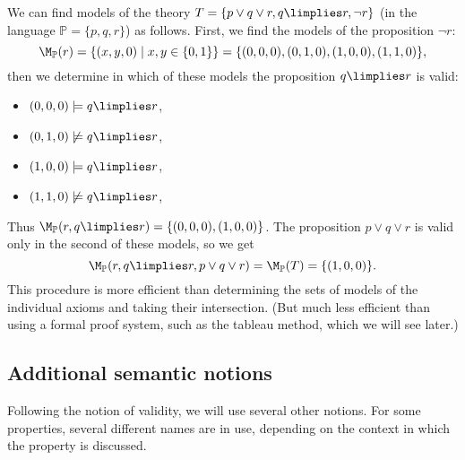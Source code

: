\begin{example}
    We can find models of the theory $T = \{p \lor q \lor r, q \limplies r, \neg r\}$ (in the language $\mathbb P = \{p, q, r\}$) as follows. First, we find the models of the proposition $\neg r$:
    $$
    \M_\mathbb P(r) = \{(x, y, 0) \mid x, y \in \{0,1\}\} = \{(0,0,0),(0,1,0),(1,0,0),(1,1,0)\},
    $$
    then we determine in which of these models the proposition $q \limplies r$ is valid: 
    \begin{itemize}
        \item $(0,0,0) \models q \limplies r$,
        \item $(0,1,0) \not\models q \limplies r$,
        \item $(1,0,0) \models q \limplies r$,
        \item $(1,1,0) \not\models q \limplies r$,
    \end{itemize}  
    Thus $\M_\mathbb P(r, q \limplies r) = \{(0,0,0),(1,0,0)\}$. The proposition $p \lor q \lor r$ is valid only in the second of these models, so we get
    $$
    \M_\mathbb P(r, q \limplies r, p \lor q \lor r) = \M_\mathbb P(T) = \{(1,0,0)\}.
    $$
    This procedure is more efficient than determining the sets of models of the individual axioms and taking their intersection. (But much less efficient than using a formal proof system, such as the tableau method, which we will see later.)
\end{example}


\subsection{Additional semantic notions}

Following the notion of validity, we will use several other notions. For some properties, several different names are in use, depending on the context in which the property is discussed.

